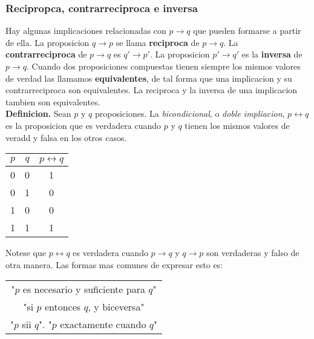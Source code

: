 \documentclass[]{article}
\begin{document}
\subsubsection*{Recipropca, contrarreciproca e inversa}

Hay algunas implicaciones relacionadas con $p \rightarrow q$ que pueden formarse a partir de ella. La proposicion $q \rightarrow p$ se llama \textbf{reciproca} de $p \rightarrow q$. La \textbf{contrarreciproca} de $p \rightarrow q$ es $q' \rightarrow p'$. La proposicion $p' \rightarrow q'$ es la \textbf{inversa} de $p \rightarrow q$. 
Cuando dos proposiciones compuestas tienen siempre los mismos valores de verdad las llamamos \textbf{equivalentes}, de tal forma que una implicacion y su contrarreciproca son equivalentes. La reciproca y la inversa de una implicacion tambien son equivalentes.\\

\textbf{Definicion.} Sean $p$ y $q$ proposiciones. La \textit{bicondicional}, o \textit{doble impliacion}, $p \leftrightarrow q$ es la proposicion que es verdadera cuando $p$ y $q$ tienen los mismos valores de veradd y falsa en los otros casos.\\

	\begin{table}[H]
		\begin{center}
			\label{tab:then}
			\begin{tabular}{cc|c}
				$p$ & $q$ & $p \leftrightarrow q$ \\
				\hline
				0 & 0 & 1 \\
				0 & 1 & 0 \\
				1 & 0 & 0 \\
				1 & 1 & 1 \\
			\end{tabular}
		\end{center}
	\end{table}

Notese que $p \leftrightarrow q$ es verdadera cuando $p \rightarrow q$ y $q \rightarrow p$ son verdaderas y falso de otra manera. Las formas mas comunes de expresar esto es:

	\begin{table}[H]
		\begin{center}
			\begin{tabular}{c}
				"$p$ es necesario y suficiente para $q$"\\
				"si $p$ entonces $q$, y biceversa"\\
				"$p$ sii $q$". "$p$ exactamente cuando $q$"
			\end{tabular}
		\end{center}
	\end{table}
\end{document}
